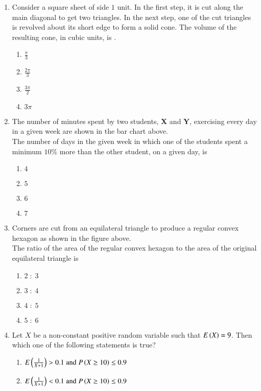 \documentclass[journal,12pt,onecolumn]{IEEEtran}
\theoremstyle{remark}
\begin{document}
\begin{enumerate}
\begin{enumerate}
\end{enumerate}
\item Consider a square sheet of side $1$ unit. In the first step, it is cut along the main diagonal to get two triangles. In the next step, one of the cut triangles is revolved about its short edge to form a solid cone. The volume of the resulting cone, in cubic units, is \underline{\hspace{2cm}}.
\begin{enumerate}
    \item $\frac{\pi}{3}$
    \item $\frac{2\pi}{3}$
    \item $\frac{3\pi}{2}$
    \item $3\pi$
\end{enumerate}
\item 

The number of minutes spent by two students, \textbf{X} and \textbf{Y}, exercising every day in a given week are shown in the bar chart above.\\ The number of days in the given week in which one of the students spent a minimum $10\%$ more than the other student, on a given day, is
\begin{enumerate}
    \item $4$
    \item $5$
    \item $6$
    \item $7$
\end{enumerate}
\item 
Corners are cut from an equilateral triangle to produce a regular convex hexagon as shown in the figure above.\\ 

The ratio of the area of the regular convex hexagon to the area of the original equilateral triangle is
\begin{enumerate}
    \item $2\;:\;3$
    \item $3\;:\;4$
    \item $4\;:\;5$
    \item $5\;:\;6$
\end{enumerate}
\item Let $X$ be a non-constant positive random variable such that $E\left(X\right)=9$. Then which one of the following statements is true?
\begin{enumerate}
    \item $E\left(\frac{1}{X+1}\right)>0.1 \; \text{and} \; P\left(X\geq10\right)\leq0.9$
    \item $E\left(\frac{1}{X+1}\right)<0.1 \; \text{and} \; P\left(X\geq10\right)\leq0.9$

\end{enumerate}
\end{enumerate}
\end{document}
